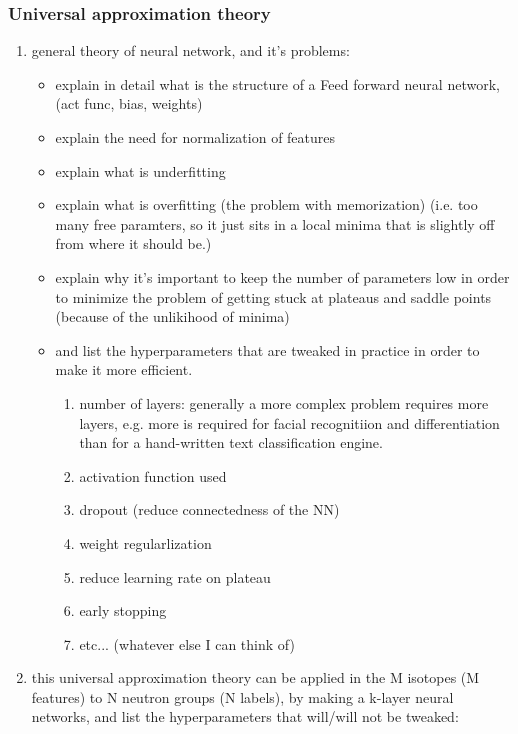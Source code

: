 \documentclass[a4paper, 12pt]{article}
\begin{document}
    \subsubsection{Universal approximation theory}
    \begin{enumerate}
        \item general theory of neural network, and it's problems:
        \begin{itemize}
            \item explain in detail what is the structure of a Feed forward neural network, (act func, bias, weights)
            \item explain the need for normalization of features
            \item explain what is underfitting
            \item explain what is overfitting (the problem with memorization) (i.e. too many free paramters, so it just sits in a local minima that is slightly off from where it should be.)
            \item explain why it's important to keep the number of parameters low in order to minimize the problem of getting stuck at plateaus and saddle points (because of the unlikihood of minima)
            \item and list the hyperparameters that are tweaked in practice in order to make it more efficient.
            \begin{enumerate}
                 \item number of layers: generally a more complex problem requires more layers, e.g. more is required for facial recognitiion and differentiation than for a hand-written text classification engine.
                 \item activation function used
                 \item dropout (reduce connectedness of the NN)
                 \item weight regularlization
                 \item reduce learning rate on plateau
                 \item early stopping
                 \item etc... (whatever else I can think of)
             \end{enumerate}
        \end{itemize}
        \item this universal approximation theory can be applied in the M isotopes (M features) to N neutron groups (N labels), by making a k-layer neural networks, and list the hyperparameters that will/will not be tweaked:

\end{enumerate}
\end{document}

